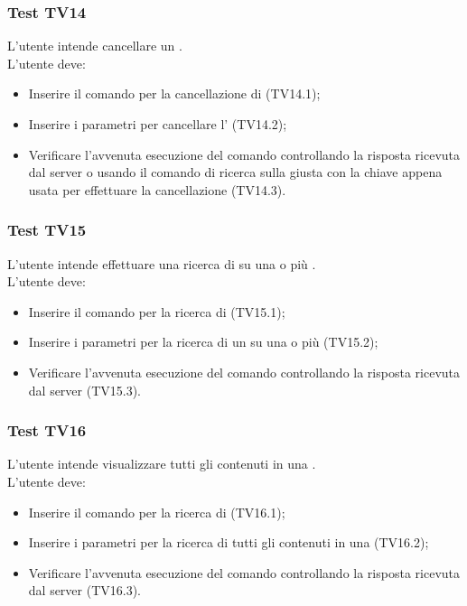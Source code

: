 \documentclass{scalatekids-article}
\begin{document}
\subsubsection{Test TV14}

L'utente intende cancellare un .\\
L'utente deve:
\begin{itemize}
\item Inserire il comando per la cancellazione di  (TV14.1);
\item Inserire i parametri per cancellare l' (TV14.2);
\item Verificare l'avvenuta esecuzione del comando controllando la risposta ricevuta dal server o usando il comando di ricerca sulla  giusta con la chiave appena usata per effettuare la cancellazione (TV14.3).
\end{itemize}

\subsubsection{Test TV15}

L'utente intende effettuare una ricerca di  su una o più .\\
L'utente deve:
\begin{itemize}
\item Inserire il comando per la ricerca di  (TV15.1);
\item Inserire i parametri per la ricerca di un  su una o più  (TV15.2);
\item Verificare l'avvenuta esecuzione del comando controllando la risposta ricevuta dal server (TV15.3).
\end{itemize}

\subsubsection{Test TV16}

L'utente intende visualizzare tutti gli  contenuti in una .\\
L'utente deve:
\begin{itemize}
\item Inserire il comando per la ricerca di  (TV16.1);
\item Inserire i parametri per la ricerca di tutti gli  contenuti in una  (TV16.2);
\item Verificare l'avvenuta esecuzione del comando controllando la risposta ricevuta dal server (TV16.3).
\end{itemize}
\end{document}
